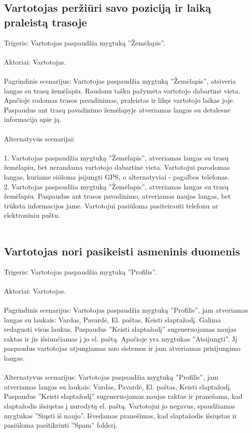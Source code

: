 \documentclass[oneside]{VUMIFPSkursinis}
\begin{document}
\subsection{Vartotojas peržiūri savo poziciją ir laiką praleistą trasoje}
Trigeris: Vartotojas paspaudžia mygtuką ''Žemėlapis''.\\ \\
Aktoriai: Vartotojas.\\ \\
Pagrindinis scenarijus: Vartotojas paspaudžia mygtuką ''Žemėlapis'', atsiveria langas su trasų žemėlapiu. Raudonu tašku pažymėta vartotojo dabartinė vieta. Apačioje rodomas trasos pavadinimas, praleistas ir likęs vartotojo laikas joje. Paspaudus ant trasų pavadinimo žemėlapyje atveriamas langas su detalesne informacija apie ją.\\ \\
Alternatyvūs scenarijai:  \\ \\
1. Vartotojas paspaudžia mygtuką ''Žemėlapis'', atveriamas langas su trasų žemėlapiu, bet nerandama vartotojo dabartinė vieta. Vartotojui parodomas langas, kuriame siūloma įsijungti GPS, o alternatyviai - pagalbos telefonas.\\
2. Vartotojas paspaudžia mygtuką ''Žemėlapis'', atveriamas langas su trasų žemėlapiu. Paspaudus ant trasos pavadinimo, atveriamas naujas langas, bet trūksta informacijos jame.  Vartotojui pasiūloma pasiteirauti telefonu ar elektroniniu paštu. \\ \\ 

\subsection{Vartotojas nori pasikeisti asmeninis duomenis}
Trigeris: Vartotojas paspaudžia mygtuką ''Profilis''. \\ \\
Aktoriai: Vartotojas.\\ \\
Pagrindinis scenarijus: Vartotojas paspaudžia mygtuką ''Profilis'', jam atveriamas langas su laukais: Vardas, Pavardė, El. paštas, Keisti slaptažodį. Galima redaguoti visus laukus. Paspaudus ''Keisti slaptažodį'' sugeneruojamas naujas raktas ir jis išsiunčiamas į jo el. paštą. Apačioje yra mygtukas ''Atsijungti''. Jį paspaudus vartotojas atjungiamas nuo sistemos ir jam atveriamas prisijungimo langas. \\ \\
Alternatyvus scenarijus: Vartotojas paspaudžia mygtuką ''Profilis'', jam atveriamas langas su laukais: Vardas, Pavardė, El. paštas, Keisti slaptažodį.  Paspaudus ''Keisti slaptažodį'' sugeneruojamas naujas raktas ir pranešama, kad slaptažodis išsiųstas į nurodytą el. paštą. Vartotojui jo negavus, spaudžiamas mygtukas ''Siųsti iš naujo''. Išvedamas pranešimas, kad slaptažodis išsiųstas ir pasiūloma pasitikrinti  ''Spam'' folderį. \\ \\ 
\end{document}
